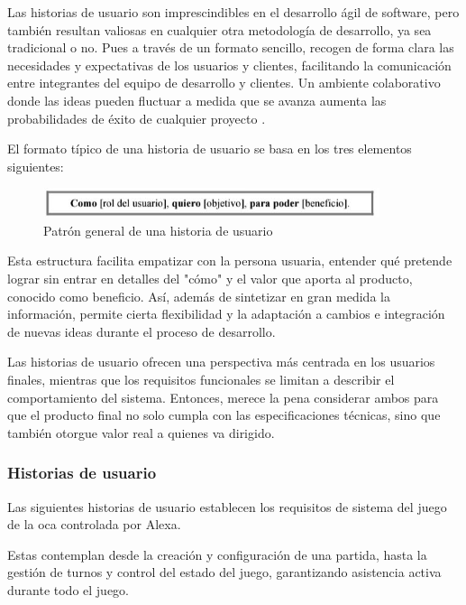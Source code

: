 Las historias de usuario son imprescindibles en el desarrollo ágil de software, pero también resultan valiosas en cualquier otra metodología de desarrollo, ya sea tradicional o no. Pues a través de un formato sencillo, recogen de forma clara las necesidades y expectativas de los usuarios y clientes, facilitando la comunicación entre integrantes del equipo de desarrollo y clientes. Un ambiente colaborativo donde las ideas pueden fluctuar a medida que se avanza aumenta las probabilidades de éxito de cualquier proyecto \parencite{introHU}.

El formato típico de una historia de usuario se basa en los  tres elementos siguientes:

\begin{figure}[H]
	\centering
	\includegraphics[width=0.88\textwidth]{imgs/formatoHU.jpg}
	\caption{Patrón general de una historia de usuario}
	\label{fig:formatoHU}
\end{figure}

Esta estructura facilita empatizar con la persona usuaria, entender qué pretende lograr sin entrar en detalles del "cómo" y el valor que aporta al producto, conocido como beneficio. Así, además de sintetizar en gran medida la información, permite cierta flexibilidad y la adaptación a cambios e integración de nuevas ideas durante el proceso de desarrollo.

Las historias de usuario ofrecen una perspectiva más centrada en los usuarios finales, mientras que los requisitos funcionales se limitan a describir el comportamiento del sistema. Entonces, merece la pena considerar ambos para que el producto final no solo cumpla con las especificaciones técnicas, sino que también otorgue valor real a quienes va dirigido.

\subsubsection{Historias de usuario}

Las siguientes historias de usuario establecen los requisitos de sistema del juego de la oca controlada por Alexa.

Estas contemplan desde la creación y configuración de una partida, hasta la gestión de turnos y control del estado del juego, garantizando asistencia activa durante todo el juego.

